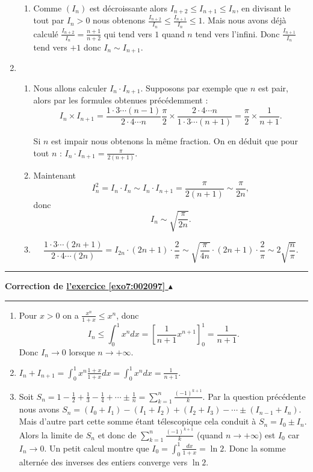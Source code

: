 \documentclass[11pt,a4paper]{article}
\newcounter{exo}
\newcommand{\correction}[1]{\hypertarget{cor7:#1}{}\label{cor7:#1}{\bf Correction de \hyperlink{exo7:#1}{l'exercice \ref{exo7:#1} $\blacktriangle$}}\vspace{1mm}\hrule\vspace{1mm}}
\newcommand{\fincorrection}{\vspace{1mm}\hrule\vspace*{7mm}}
\begin{document}
\begin{enumerate}
\begin{enumerate}
     \item Comme $(I_n)$ est décroissante alors $I_{n+2} \leqslant I_{n+1} \leqslant I_n$, en 
divisant le tout par $I_n>0$ nous obtenons $\frac{I_{n+2}}{I_n} \leqslant \frac{I_{n+1}}{I_n} \leqslant 1$.
Mais nous avons déjà calculé $\frac{I_{n+2}}{I_n} = \frac{n+1}{n+2}$ 
qui tend vers $1$ quand $n$ tend vers l'infini. Donc $ \frac{I_{n+1}}{I_n}$ tend vers $+1$ donc $I_{n} \sim I_{n+1}$.

  \end{enumerate}

  \item 
  \begin{enumerate}
     \item Nous allons calculer $I_n\cdot I_{n+1}$.
Supposons par exemple que $n$ est pair, alors par les formules obtenues précédemment :
$$I_n \times I_{n+1} = 
\frac{1\cdot3 \cdots (n-1) }{2 \cdot 4 \cdots n} \frac \pi 2 \times 
\frac{2 \cdot 4 \cdots n}{1 \cdot 3 \cdots (n+1)} = \frac \pi 2 \times \frac{1}{n+1}.$$

Si $n$ est impair nous obtenons la même fraction. 
On en déduit que pour tout $n$ : $I_n \cdot I_{n+1} = \frac{\pi}{2(n+1)}$.

     \item Maintenant 
$$I_n^2 = I_n \cdot I_n \sim I_n \cdot I_{n+1} = \frac \pi {2(n+1)} \sim  \frac \pi {2n},$$
donc $$I_n \sim \sqrt{\frac \pi {2n}}.$$

     \item $$\frac{1\cdot3 \cdots (2n+1) }{2\cdot 4 \cdots (2n) } 
= I_{2n} \cdot (2n+1) \cdot \frac 2 \pi  \sim \sqrt{\frac \pi {4n}} \cdot (2n+1) \cdot \frac 2 \pi 
 \sim 2\sqrt {\frac n \pi}.$$

  \end{enumerate}

\end{enumerate}
\fincorrection
\correction{002097}
  \begin{enumerate}
  \item Pour $x>0$ on a $\frac{x^n}{1+x} \leqslant x^n$,
donc 
$$I_n  \leqslant \int_0^1 x^n dx = \left[ \frac{1}{n+1} x^{n+1} \right]_0^1=\frac{1}{n+1}.$$
Donc $I_n \to 0$ lorsque $n\to +\infty$.
  \item $I_n+I_{n+1}=\int_0^1 x^n \frac {1+x}{1+x} dx =  \int_0^1 x^n dx=\frac{1}{n+1}$.
  \item Soit $S_n = 1-\frac 12 + \frac13-\frac 14 +\cdots \pm \frac 1n = \sum_{k = 1}^n \frac{
 (-1)^{k + 1}}k$.
Par la question pr\'ec\'edente nous avons 
$S_n = (I_0+I_1)-(I_1+I_2)+(I_2+I_3)- \cdots \pm (I_{n-1}+I_n)$.
Mais d'autre part cette somme \'etant t\'elescopique cela conduit à $S_n = I_0 \pm I_n$.
 Alors la limite de $S_n$ et donc de $\sum_{k = 1}^n \frac{
 (-1)^{k + 1}}k$ (quand $n\to +\infty$) est $I_0$ car $I_n \to 0$.
Un petit calcul montre que $I_0 = \int_0^1 \frac {dx}{1+x} = \ln 2$.
Donc la somme altern\'ee des inverses des entiers converge vers $\ln 2$.
  \end{enumerate}
\end{document}
